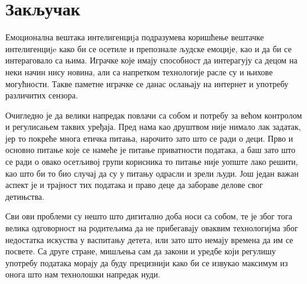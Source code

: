 \documentclass{article}
\begin{document}
\newpage
\section{Закључак}
Емоционална вештака интелигенциjа подразумева коришћење вештачке 
интелигенциje како би се осетиле и препознале људске емоциjе, као и да би се интераговало са њима. Играчке које имају способност да интерагују са децом на неки начин нису новина, али са напретком технологије расле су и њихове могућности. Такве паметне играчке се данас ослањају на интернет и употребу различитих сензора. 

Очигледно је да велики напредак повлачи са собом и потребу за већом контролом и регулисањем таквих уређаја. Пред нама као друштвом није нимало лак задатак, јер то покреће многа етичка питања, нарочито зато што се ради о деци. Прво и основно питање које се намеће је питање приватности података, а баш зато што се ради о овако осетљивој групи корисника то питање није уопште лако решити, као што би то био случај да су у питању одрасли и зрели људи. Још један важан аспект је и трајност тих података и право деце да забораве делове свог детињства. 

Сви ови проблеми су нешто што дигитално доба носи са собом, те је због тога велика одговорност на родитељима да не прибегавају оваквим технологијма због недостатка искуства у васпитању детета, или зато што немају времена да им се посвете. Са друге стране, мишљења сам да закони и уредбе који регулишу употребу података морају да буду прецизнији како би се извукао максимум из онога што нам технолошки напредак нуди.

\newpage
\printbibliography[title={Литература}]
\end{document}
